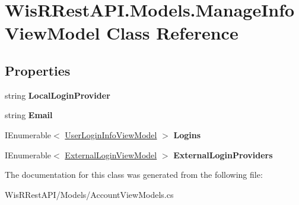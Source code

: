 \hypertarget{class_wis_r_rest_a_p_i_1_1_models_1_1_manage_info_view_model}{}\section{Wis\+R\+Rest\+A\+P\+I.\+Models.\+Manage\+Info\+View\+Model Class Reference}
\label{class_wis_r_rest_a_p_i_1_1_models_1_1_manage_info_view_model}
\subsection*{Properties}
\begin{DoxyCompactItemize}
\item 
\hypertarget{class_wis_r_rest_a_p_i_1_1_models_1_1_manage_info_view_model_ad020a541769d927e0236a268c1ed0338}{}string {\bfseries Local\+Login\+Provider}\label{class_wis_r_rest_a_p_i_1_1_models_1_1_manage_info_view_model_ad020a541769d927e0236a268c1ed0338}

\item 
\hypertarget{class_wis_r_rest_a_p_i_1_1_models_1_1_manage_info_view_model_ac57e6abfd5f8ef4fa04c17e11f66e9e7}{}string {\bfseries Email}\label{class_wis_r_rest_a_p_i_1_1_models_1_1_manage_info_view_model_ac57e6abfd5f8ef4fa04c17e11f66e9e7}

\item 
\hypertarget{class_wis_r_rest_a_p_i_1_1_models_1_1_manage_info_view_model_a1e7238b8d3fcd823d111a11a19f7b95a}{}I\+Enumerable$<$ \hyperlink{class_wis_r_rest_a_p_i_1_1_models_1_1_user_login_info_view_model}{User\+Login\+Info\+View\+Model} $>$ {\bfseries Logins}\label{class_wis_r_rest_a_p_i_1_1_models_1_1_manage_info_view_model_a1e7238b8d3fcd823d111a11a19f7b95a}

\item 
\hypertarget{class_wis_r_rest_a_p_i_1_1_models_1_1_manage_info_view_model_a5a826907a1612023b87178fe2baf68fe}{}I\+Enumerable$<$ \hyperlink{class_wis_r_rest_a_p_i_1_1_models_1_1_external_login_view_model}{External\+Login\+View\+Model} $>$ {\bfseries External\+Login\+Providers}\label{class_wis_r_rest_a_p_i_1_1_models_1_1_manage_info_view_model_a5a826907a1612023b87178fe2baf68fe}

\end{DoxyCompactItemize}


The documentation for this class was generated from the following file\+:\begin{DoxyCompactItemize}
\item 
Wis\+R\+Rest\+A\+P\+I/\+Models/Account\+View\+Models.\+cs\end{DoxyCompactItemize}
